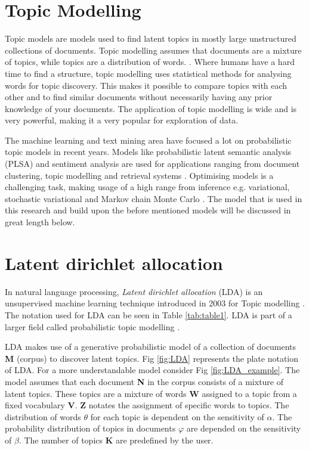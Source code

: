 \section{Topic Modelling}\label{lda:tm}
Topic models are models used to find latent topics in mostly large unstructured collections of documents. Topic modelling assumes that documents are a mixture of topics, while topics are a distribution of words. \cite{Blei2010}. Where humans have a hard time to find a structure, topic modelling uses statistical methods for analysing words for topic discovery. This makes it possible to compare topics with each other and to find similar documents without necessarily having any prior knowledge of your documents. The application of topic modelling is wide and is very powerful, making it a very popular for exploration of data. 

The machine learning and text mining area have focused a lot on probabilistic topic models in recent years. Models like probabilistic latent semantic analysis (PLSA) and sentiment analysis are used for applications ranging from document clustering, topic modelling and retrieval systems \cite{Lu2011InvestigatingLDA}. Optimising models is a challenging task, making usage of a high range from inference e.g. variational, stochastic variational and Markov chain Monte Carlo \cite{Hoffman2016MarkovModels}. The model that is used in this research and build upon the before mentioned models will be discussed in great length below.


\section{Latent dirichlet allocation}\label{lda:lda}
In natural language processing, \textit{Latent dirichlet allocation} (LDA) is an unsupervised machine learning technique introduced in 2003 for Topic modelling \cite{Blei2003}. The notation used for LDA can be seen in Table \ref{tab:table1}. LDA is part of a larger field called probabilistic topic modelling \cite{Blei2010}.

LDA makes use of a generative probabilistic model of a collection of documents \textbf{M} (corpus) to discover latent topics. Fig \ref{fig:LDA} represents the plate notation of LDA. For a more understandable model consider Fig \ref{fig:LDA_example}. The model assumes that each document \textbf{N} in the corpus consists of a mixture of latent topics. These topics are a mixture of words \textbf{W} assigned to a topic from a fixed vocabulary \textbf{V}. \textbf{Z} notates the assignment of specific words to topics. The distribution of words $\theta$ for each topic is dependent on the sensitivity of $\alpha$. The probability distribution of topics in documents $\varphi$ are depended on the sensitivity of $\beta$. The number of topics \textbf{K} are predefined by the user. 

